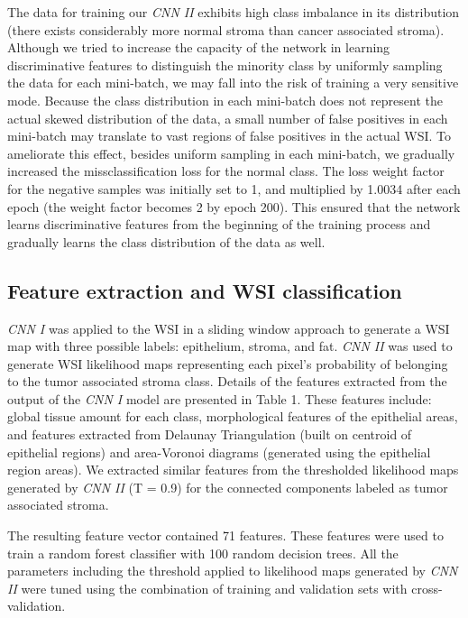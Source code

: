 \documentclass{article}
\begin{document}
The data for training our \textit{CNN II} exhibits high class imbalance in its distribution (there exists considerably more normal stroma than cancer associated stroma). Although we tried to increase the capacity of the network in learning discriminative features to distinguish the minority class by uniformly sampling the data for each mini-batch, we may fall into the risk of training a very sensitive mode. Because the class distribution in each mini-batch does not represent the actual skewed distribution of the data, a small number of false positives in each mini-batch may translate to vast regions of false positives in the actual WSI. To ameliorate this effect, besides uniform sampling in each mini-batch, we gradually increased the missclassification loss for the normal class. The loss weight factor for the negative samples was initially set to 1, and multiplied by 1.0034 after each epoch (the weight factor becomes 2 by epoch 200). This ensured that the network learns discriminative features from the beginning of the training process and gradually learns the class distribution of the data as well.

\vspace*{-5 pt}
\subsection{Feature extraction and WSI classification}
\textit{CNN I} was applied to the WSI in a sliding window approach to generate a WSI map with three possible labels: epithelium, stroma, and fat. \textit{CNN II} was used to generate WSI likelihood maps representing each pixel's probability of belonging to the tumor associated stroma class. Details of the features extracted from the output of the \textit{CNN I} model are presented in Table 1. These features include: global tissue amount for each class, morphological features of the epithelial areas, and features extracted from Delaunay Triangulation \cite{okabe2009} (built on centroid of epithelial regions) and area-Voronoi diagrams \cite{okabe2009} (generated using the epithelial region areas). We extracted similar features from the thresholded  likelihood maps generated by \textit{CNN II} (T = 0.9) for the connected components labeled as tumor associated stroma.

The resulting feature vector contained 71 features. These features were used to train a random forest classifier with 100 random decision trees. All the parameters including the threshold applied to likelihood maps generated by \textit{CNN II} were tuned using the combination of training and validation sets with cross-validation.
\end{document}
